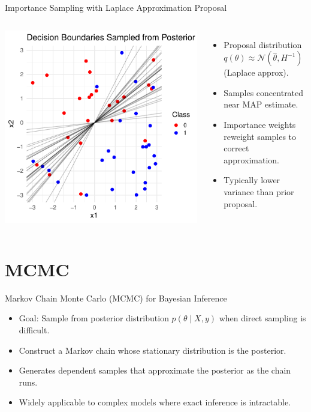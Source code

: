 \documentclass{beamer}
\begin{document}
\begin{frame}{Importance Sampling with Laplace Approximation Proposal}
\begin{columns}
  \centering
  \includegraphics[width=\textwidth]{figures/importance_sampling_from_laplace.pdf}

  \small
  \begin{itemize}
    \item Proposal distribution \( q(\theta) \approx \mathcal{N}(\hat{\theta}, H^{-1}) \) (Laplace approx).
    \item Samples concentrated near MAP estimate.
    \item Importance weights reweight samples to correct approximation.
    \item Typically lower variance than prior proposal.
  \end{itemize}
\end{columns}
\end{frame}

\section{MCMC}

\begin{frame}{Markov Chain Monte Carlo (MCMC) for Bayesian Inference}
\begin{itemize}
  \item Goal: Sample from posterior distribution \(p(\theta \mid X, y)\) when direct sampling is difficult.
  \item Construct a Markov chain whose stationary distribution is the posterior.
  \item Generates dependent samples that approximate the posterior as the chain runs.
  \item Widely applicable to complex models where exact inference is intractable.
\end{itemize}
\end{frame}
\end{document}
